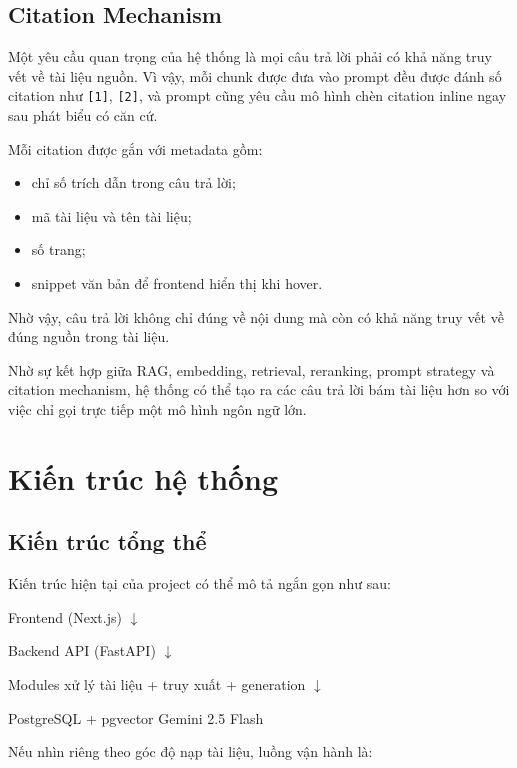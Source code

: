\documentclass[12pt]{ai_conquer2026}
\begin{document}
\subsection{Citation Mechanism}

Một yêu cầu quan trọng của hệ thống là mọi câu trả lời phải có khả năng truy vết về tài liệu nguồn. Vì vậy, mỗi chunk được đưa vào prompt đều được đánh số citation như \texttt{[1]}, \texttt{[2]}, và prompt cũng yêu cầu mô hình chèn citation inline ngay sau phát biểu có căn cứ.

Mỗi citation được gắn với metadata gồm:
\begin{itemize}
    \item chỉ số trích dẫn trong câu trả lời;
    \item mã tài liệu và tên tài liệu;
    \item số trang;
    \item snippet văn bản để frontend hiển thị khi hover.
\end{itemize}

Nhờ vậy, câu trả lời không chỉ đúng về nội dung mà còn có khả năng truy vết về đúng nguồn trong tài liệu.

Nhờ sự kết hợp giữa RAG, embedding, retrieval, reranking, prompt strategy và citation mechanism, hệ thống có thể tạo ra các câu trả lời bám tài liệu hơn so với việc chỉ gọi trực tiếp một mô hình ngôn ngữ lớn.


\section{Kiến trúc hệ thống}

\subsection{Kiến trúc tổng thể}

Kiến trúc hiện tại của project có thể mô tả ngắn gọn như sau:

\begin{aivnoutputbox}
Frontend (Next.js) 
$\downarrow$

Backend API (FastAPI)
$\downarrow$

Modules xử lý tài liệu + truy xuất + generation
$\downarrow$

PostgreSQL + pgvector \hspace{1em} Gemini 2.5 Flash
\end{aivnoutputbox}

Nếu nhìn riêng theo góc độ nạp tài liệu, luồng vận hành là:
\end{document}
